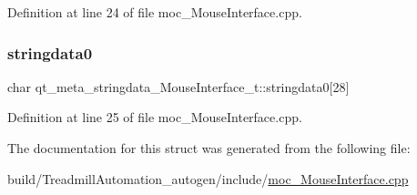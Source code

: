 Definition at line 24 of file moc\+\_\+\+Mouse\+Interface.\+cpp.

\mbox{\label{structqt__meta__stringdata___mouse_interface__t_af2814745e298ad7bf47432922ee4bbb3}} 
\subsubsection{\texorpdfstring{stringdata0}{stringdata0}}
{\footnotesize\ttfamily char qt\+\_\+meta\+\_\+stringdata\+\_\+\+Mouse\+Interface\+\_\+t\+::stringdata0\mbox{[}28\mbox{]}}



Definition at line 25 of file moc\+\_\+\+Mouse\+Interface.\+cpp.



The documentation for this struct was generated from the following file\+:\begin{DoxyCompactItemize}
\item 
build/\+Treadmill\+Automation\+\_\+autogen/include/\hyperlink{moc___mouse_interface_8cpp}{moc\+\_\+\+Mouse\+Interface.\+cpp}\end{DoxyCompactItemize}
